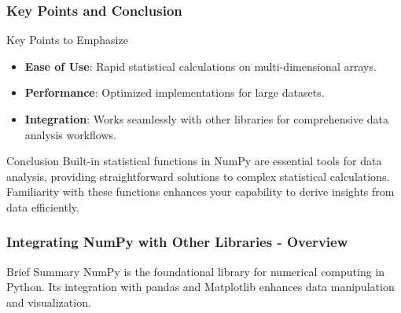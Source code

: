 \documentclass{beamer}
\begin{document}
\begin{frame}[fragile]
    \frametitle{Key Points and Conclusion}
    \begin{block}{Key Points to Emphasize}
        \begin{itemize}
            \item \textbf{Ease of Use}: Rapid statistical calculations on multi-dimensional arrays.
            \item \textbf{Performance}: Optimized implementations for large datasets.
            \item \textbf{Integration}: Works seamlessly with other libraries for comprehensive data analysis workflows.
        \end{itemize}
    \end{block}
    
    \begin{block}{Conclusion}
        Built-in statistical functions in NumPy are essential tools for data analysis, providing straightforward solutions to complex statistical calculations. Familiarity with these functions enhances your capability to derive insights from data efficiently.
    \end{block}
\end{frame}

\begin{frame}[fragile]
    \frametitle{Integrating NumPy with Other Libraries - Overview}
    \begin{block}{Brief Summary}
        NumPy is the foundational library for numerical computing in Python. Its integration with pandas and Matplotlib enhances data manipulation and visualization.
    \end{block}
\end{frame}
\end{document}
